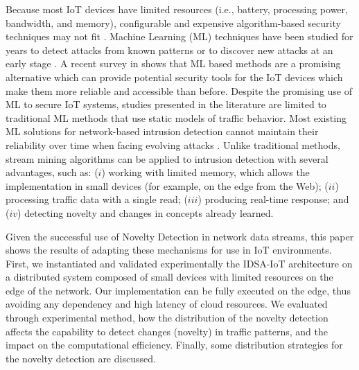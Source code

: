 Because most IoT devices have limited resources (i.e., battery, processing
power, bandwidth, and memory), configurable and expensive algorithm-based
security techniques may not fit %
\cite{Zhou2017}.
Machine Learning (ML) techniques have been studied for years to detect attacks
from known patterns or to discover new attacks at an early stage
\cite{buczak2016survey,mitchell2014survey}.
A recent survey in \cite{Tahsien2020} shows that ML based methods are a
promising alternative which can provide potential security tools for the IoT
devices which make them more reliable and accessible than before.
Despite the promising use of ML to secure IoT systems, %
studies presented in the literature %
\cite{buczak2016survey,mitchell2014survey,Tahsien2020} %
are limited to
traditional ML methods that use static models of traffic behavior.
Most existing ML solutions for network-based intrusion detection cannot maintain
their reliability over time when facing evolving attacks \cite{Viegas2019}.
Unlike traditional methods, stream mining algorithms can be applied to intrusion
detection with several advantages, such as: ($ i $) working with limited memory,
which allows the implementation in small devices (for example, on the edge from
the Web); ($ ii $) processing traffic data with a single read; ($ iii $)
producing real-time response; and ($ iv $) detecting novelty and changes in
concepts already learned.

Given the successful use of Novelty Detection in network data streams, 
this paper shows the results of adapting these mechanisms for use in IoT environments. 
First, we instantiated and validated experimentally the IDSA-IoT
architecture \cite{Cassales2019a} on a distributed system
composed of small devices with limited resources on the edge of the network.
Our implementation can be fully executed on the edge, thus avoiding any dependency
and high latency of cloud resources.
We evaluated through experimental method, how the distribution of
the novelty detection affects the capability to detect changes (novelty) in
traffic patterns, and the impact on the computational efficiency.
Finally, some distribution strategies for the novelty detection are discussed.

